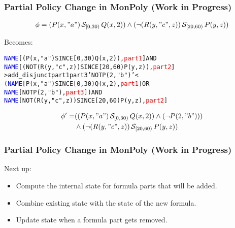 \begin{frame}
    \frametitle{Partial Policy Change in MonPoly (Work in Progress)}
    \begin{align*}
        \phi = 
        (P(x, "a") \,\mathcal{S}_{[0,30)}\, Q(x, 2))
        \land 
        (\neg (R(y, "c", z)) \,\mathcal{S}_{[20,60)}\, P(y, z))
    \end{align*}

Becomes:
\begin{alltt}
\textcolor{blue}{NAME}[(P(x,"a") SINCE[0,30) Q(x,2)), \textcolor{red}{part1}] AND \\
\textcolor{blue}{NAME}[(NOT (R(y,"c",z)) SINCE[20,60) P(y,z)), \textcolor{red}{part2}] \\

>add\_disjunct part1 part3 'NOT P(2,"b")'<\\

(\textcolor{blue}{NAME}[P(x,"a") SINCE[0,30) Q(x,2), \textcolor{red}{part1}] OR \\
\textcolor{blue}{NAME}[NOT P(2,"b"), \textcolor{red}{part3}]) AND\\
\textcolor{blue}{NAME}[NOT (R(y,"c",z)) SINCE[20,60) P(y,z), \textcolor{red}{part2}]
\end{alltt}
\vspace{-.8cm}

    \begin{align*}
        \phi' = 
        &((P(x, "a") \,\mathcal{S}_{[0,30)}\, Q(x, 2)) \land (\neg P(2, "b"))) \\
        &\land 
        (\neg (R(y, "c", z)) \,\mathcal{S}_{[20,60)}\, P(y, z))
    \end{align*}



\end{frame}


\begin{frame}
    \frametitle{Partial Policy Change in MonPoly (Work in Progress)}

    Next up:

    \begin{itemize}
        \item Compute the internal state for formula parts that will be added.
        \item Combine existing state with the state of the new formula.
        \item Update state when a formula part gets removed.
    \end{itemize}

    
\end{frame}